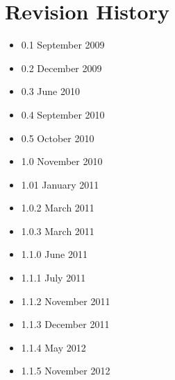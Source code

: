 \documentclass[11pt]{article}
\begin{document}
\section*{Revision History}
\begin{itemize}
\item 0.1 September 2009
\item 0.2 December 2009
\item 0.3 June 2010
\item 0.4 September 2010
\item 0.5 October 2010
\item 1.0 November 2010
\item 1.01 January 2011
\item 1.0.2 March 2011
\item 1.0.3 March 2011
\item 1.1.0 June 2011
\item 1.1.1 July 2011
\item 1.1.2 November 2011
\item 1.1.3 December 2011
\item 1.1.4 May 2012
\item 1.1.5 November 2012
\end{itemize}



\end{document}
